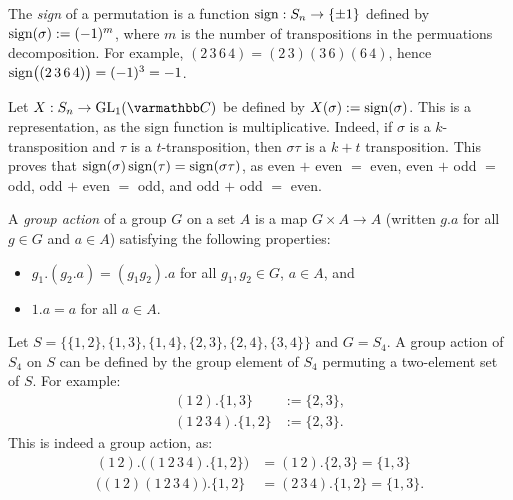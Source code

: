\begin{recall}
	The \textit{sign} of a permutation is a function $\operatorname{sign}:S_n \rightarrow \{\pm 1\}$ defined by $\operatorname{sign}(\sigma) := (-1)^m$, where $m$ is the number of transpositions in the permuations decomposition. For example, $(2\,3\,6\,4) = (2\,3)(3\,6)(6\,4)$, hence $\operatorname{sign}\bigl((2\,3\,6\,4)\bigr) = (-1)^3 = -1$.
\end{recall}

\begin{example}
	Let $X:S_n \rightarrow \GL_1(\bfC)$ be defined by $X(\sigma) := \operatorname{sign}(\sigma)$. This is a representation, as the sign function is multiplicative. Indeed, if $\sigma$ is a $k$-transposition and $\tau$ is a $t$-transposition, then $\sigma \tau$ is a $k+t$ transposition. This proves that $\operatorname{sign}(\sigma)\operatorname{sign}(\tau) = \operatorname{sign}(\sigma \tau)$, as even $+$ even $=$ even, even $+$ odd $=$ odd, odd $+$ even $=$ odd, and odd $+$ odd $=$ even.
\end{example}

\begin{recall}
	A \textit{group action} of a group $G$ on a set $A$ is a map $G \times A \rightarrow A$ (written $g.a$ for all $g \in G$ and $a \in A$) satisfying the following properties:
	\mbox{}
	\begin{itemize}[itemsep=1pt,topsep=3pt]
		\item $g_1.(g_2.a) = (g_1g_2).a$ for all $g_1,g_2 \in G$, $a\in A$, and
		\item $1.a = a$ for all $a \in A$.
	\end{itemize}
\end{recall}

\begin{example}
	Let $S = \{ \{1,2\},\{1,3\},\{1,4\},\{2,3\},\{2,4\},\{3,4\}\}$ and $G = S_4$. A group action of $S_4$ on $S$ can be defined by the group element of $S_4$ permuting a two-element set of $S$. For example:
	\begin{align*}
		(1\,2) . \{1,3\} &:= \{2,3\}, \\
		(1\,2\,3\,4).\{1,2\} &:= \{2,3\}.
	\end{align*}
	This is indeed a group action, as:
	\begin{align*}
		(1\,2).\bigl( (1\,2\,3\,4).\{1,2\}\bigr) &= (1\,2).\{2,3\} = \{1,3\} \\
		\bigl((1\,2)(1\,2\,3\,4) \bigr).\{1,2\} &= (2\,3\,4) . \{1,2\} = \{1,3\}.
	\end{align*}
\end{example}

